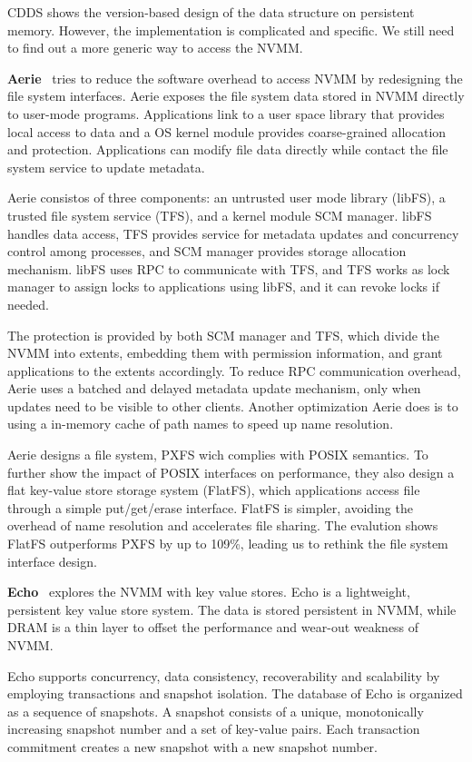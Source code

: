 CDDS shows the version-based design of the data structure on persistent
memory. However, the implementation is complicated and specific. We still
need to find out a more generic way to access the NVMM.

\textbf{Aerie}~\cite{Aerie} tries to reduce the software overhead to access NVMM
by redesigning the file system interfaces. Aerie exposes the file system
data stored in NVMM directly to user-mode programs. Applications link to
a user space library that provides local access to data and a OS kernel
module provides coarse-grained allocation and protection. Applications can
modify file data directly while contact the file system service to update
metadata.

Aerie consistos of three components: an untrusted user mode library (libFS),
a trusted file system service (TFS), and a kernel module SCM manager. libFS
handles data access, TFS provides service for metadata updates and concurrency
control among processes, and SCM manager provides storage allocation mechanism.
libFS uses RPC to communicate with TFS, and TFS works as lock manager to 
assign locks to applications using libFS, and it can revoke locks if needed.

The protection is provided by both SCM manager and TFS, which divide the NVMM
into extents, embedding them with permission information, and grant applications
to the extents accordingly. To reduce RPC communication overhead, Aerie
uses a batched and delayed metadata update mechanism, only when updates need to
be visible to other clients. Another optimization Aerie does is to using
a in-memory cache of path names to speed up name resolution.

Aerie designs a file system, PXFS wich complies with POSIX semantics.
To further show the impact of POSIX interfaces on performance, they also design a flat
key-value store storage system (FlatFS), which applications access file
through a simple put/get/erase interface. FlatFS is simpler, avoiding the
overhead of name resolution and accelerates file sharing. The evalution shows FlatFS
outperforms PXFS by up to 109\%, leading us to rethink the file system interface design.

\textbf{Echo}~\cite{echo} explores the NVMM with key value stores.
 Echo is a lightweight,
persistent key value store system. The data is stored persistent in NVMM,
while DRAM is a thin layer to offset the performance and wear-out weakness of
NVMM.

Echo supports concurrency, data consistency, recoverability and scalability
by employing transactions and snapshot isolation. The database of Echo is
organized as a sequence of snapshots. A snapshot consists of a unique, monotonically
increasing snapshot number and a set of key-value pairs. Each transaction
commitment creates a new snapshot with a new snapshot number. 

